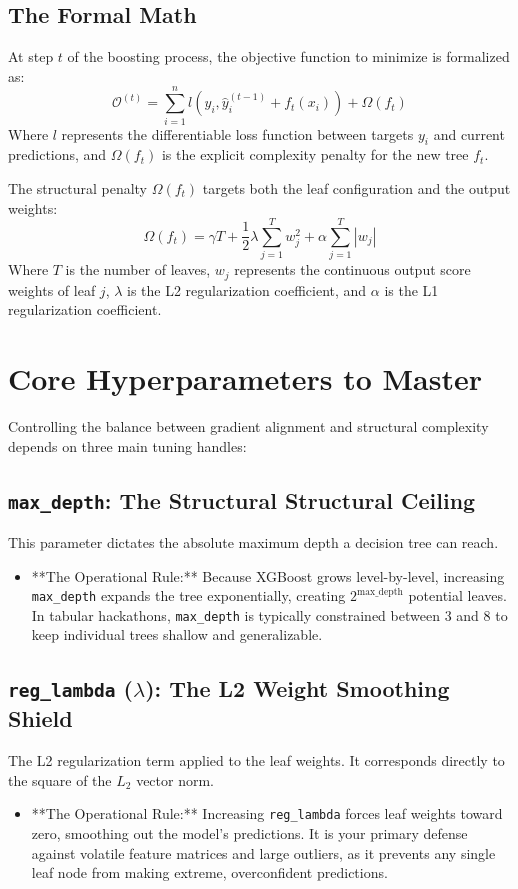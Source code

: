 \documentclass{article}
\begin{document}
\subsection{The Formal Math}
At step $t$ of the boosting process, the objective function to minimize is formalized as:
\begin{equation}
    \mathcal{O}^{(t)} = \sum_{i=1}^{n} l\left(y_i, \hat{y}_i^{(t-1)} + f_t(x_i)\right) + \Omega(f_t)
\end{equation}
Where $l$ represents the differentiable loss function between targets $y_i$ and current predictions, and $\Omega(f_t)$ is the explicit complexity penalty for the new tree $f_t$.

The structural penalty $\Omega(f_t)$ targets both the leaf configuration and the output weights:
\begin{equation}
    \Omega(f_t) = \gamma T + \frac{1}{2}\lambda \sum_{j=1}^{T} w_j^2 + \alpha \sum_{j=1}^{T} |w_j|
\end{equation}
Where $T$ is the number of leaves, $w_j$ represents the continuous output score weights of leaf $j$, $\lambda$ is the L2 regularization coefficient, and $\alpha$ is the L1 regularization coefficient.

\section{Core Hyperparameters to Master}
Controlling the balance between gradient alignment and structural complexity depends on three main tuning handles:

\subsection{\texttt{max\_depth}: The Structural Structural Ceiling}
This parameter dictates the absolute maximum depth a decision tree can reach.
\begin{itemize}
    \item **The Operational Rule:** Because XGBoost grows level-by-level, increasing \texttt{max\_depth} expands the tree exponentially, creating $2^{\text{max\_depth}}$ potential leaves. In tabular hackathons, \texttt{max\_depth} is typically constrained between $3$ and $8$ to keep individual trees shallow and generalizable.
\end{itemize}

\subsection{\texttt{reg\_lambda} ($\lambda$): The L2 Weight Smoothing Shield}
The L2 regularization term applied to the leaf weights. It corresponds directly to the square of the $L_2$ vector norm.
\begin{itemize}
    \item **The Operational Rule:** Increasing \texttt{reg\_lambda} forces leaf weights toward zero, smoothing out the model's predictions. It is your primary defense against volatile feature matrices and large outliers, as it prevents any single leaf node from making extreme, overconfident predictions.
\end{itemize}
\end{document}

